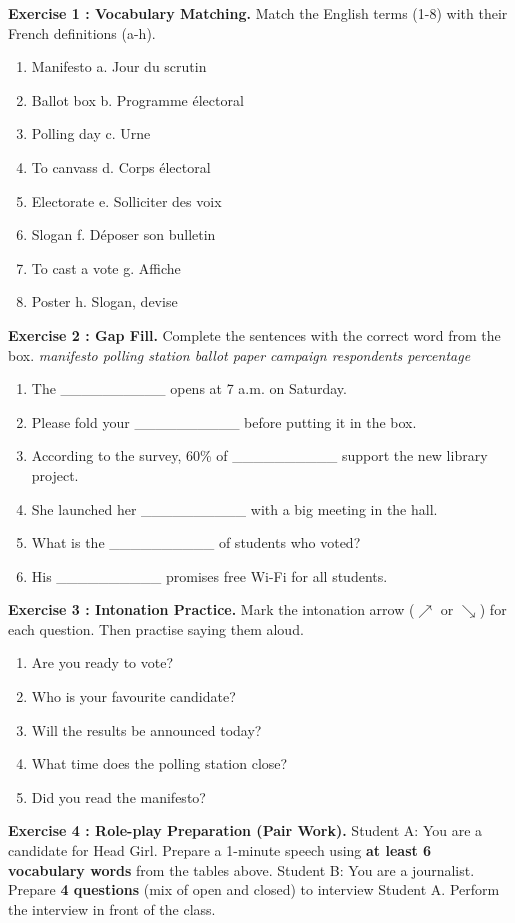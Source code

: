 \documentclass[11pt]{article}
\newcommand{\cle}[1]{{\popxbold\color{popdark}#1}}
\begin{document}
\begin{exercice}
\textbf{Exercise 1 : Vocabulary Matching.} Match the English terms (1-8) with their French definitions (a-h).
\begin{enumerate}
\item Manifesto \hfill a. Jour du scrutin
\item Ballot box \hfill b. Programme électoral
\item Polling day \hfill c. Urne
\item To canvass \hfill d. Corps électoral
\item Electorate \hfill e. Solliciter des voix
\item Slogan \hfill f. Déposer son bulletin
\item To cast a vote \hfill g. Affiche
\item Poster \hfill h. Slogan, devise
\end{enumerate}

\textbf{Exercise 2 : Gap Fill.} Complete the sentences with the correct word from the box.
\emph{manifesto \quad polling station \quad ballot paper \quad campaign \quad respondents \quad percentage}
\begin{enumerate}
\item The \_\_\_\_\_\_\_\_\_\_ opens at 7 a.m. on Saturday.
\item Please fold your \_\_\_\_\_\_\_\_\_\_ before putting it in the box.
\item According to the survey, 60\% of \_\_\_\_\_\_\_\_\_\_ support the new library project.
\item She launched her \_\_\_\_\_\_\_\_\_\_ with a big meeting in the hall.
\item What is the \_\_\_\_\_\_\_\_\_\_ of students who voted?
\item His \_\_\_\_\_\_\_\_\_\_ promises free Wi-Fi for all students.
\end{enumerate}

\textbf{Exercise 3 : Intonation Practice.} Mark the intonation arrow ($\nearrow$ or $\searrow$) for each question. Then practise saying them aloud.
\begin{enumerate}
\item Are you ready to vote?
\item Who is your favourite candidate?
\item Will the results be announced today?
\item What time does the polling station close?
\item Did you read the manifesto?
\end{enumerate}

\textbf{Exercise 4 : Role-play Preparation (Pair Work).}
Student A: You are a candidate for \cle{Head Girl}. Prepare a 1-minute speech using \textbf{at least 6 vocabulary words} from the tables above.
Student B: You are a journalist. Prepare \textbf{4 questions} (mix of open and closed) to interview Student A.
Perform the interview in front of the class.
\end{exercice}
\end{document}
